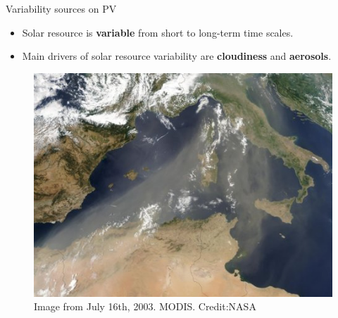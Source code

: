 \documentclass{beamer}%
\begin{document}
\begin{frame}[plain]{Variability sources on PV}
  \begin{itemize}
  \item Solar resource is \textbf{variable} from short to long-term time scales. %
  \item  Main drivers of solar resource variability are \textbf{cloudiness} and \textbf{aerosols}.
\end{itemize}
       \begin{figure}
        \centering\includegraphics[scale=0.3]{ImageMODIScreditNASA}
        \centering\caption{Image from July 16th, 2003. MODIS. Credit:NASA}
\end{figure}
\end{frame}
\end{document}
